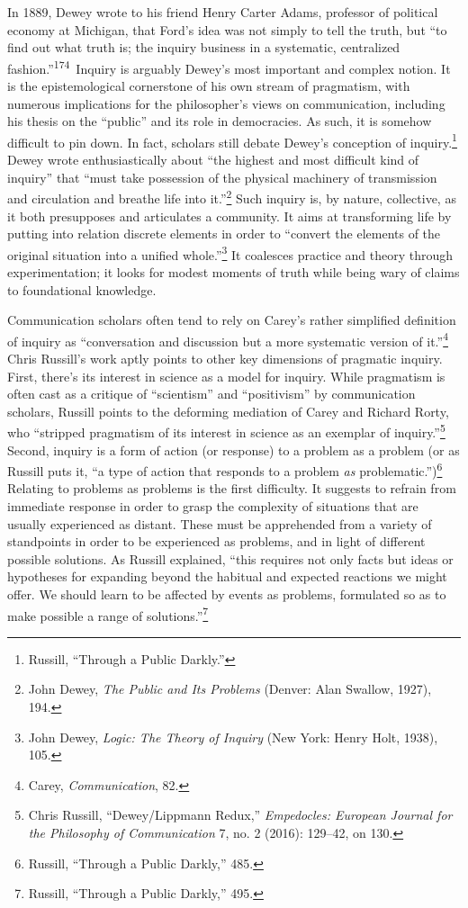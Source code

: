 \documentclass[twoside,symmetric,nobib,justified]{tufte-book}
\begin{document}
In 1889, Dewey wrote to his friend Henry Carter Adams, professor of
political economy at Michigan, that Ford's idea was not simply to tell
the truth, but ``to find out what truth is; the inquiry business in a
systematic, centralized fashion.''\textsuperscript{174}\ Inquiry is arguably Dewey's most important and
complex notion. It is the epistemological cornerstone of his own stream
of pragmatism, with numerous implications for the philosopher's views on
communication, including his thesis on the ``public'' and its role in
democracies. As such, it is somehow difficult to pin down. In fact,
scholars still debate Dewey's conception of inquiry.\footnote{Russill,
  ``Through a Public Darkly.''} Dewey wrote enthusiastically about ``the
highest and most difficult kind of inquiry'' that ``must take possession
of the physical machinery of transmission and circulation and breathe
life into it.''\footnote{John Dewey, \emph{The Public and Its Problems}
  (Denver: Alan Swallow, 1927), 194.} Such inquiry is, by nature,
collective, as it both presupposes and articulates a community. It aims
at transforming life by putting into relation discrete elements in order
to ``convert the elements of the original situation into a unified
whole.''\footnote{John Dewey, \emph{Logic: The Theory of Inquiry} (New
  York: Henry Holt, 1938), 105.} It coalesces practice and theory
through experimentation; it looks for modest moments of truth while
being wary of claims to foundational knowledge.

Communication scholars often tend to rely on Carey's rather simplified
definition of inquiry as ``conversation and discussion but a more
systematic version of it.''\footnote{Carey, \emph{Communication}, 82.}
Chris Russill's work aptly points to other key dimensions of pragmatic
inquiry. First, there's its interest in science as a model for inquiry.
While pragmatism is often cast as a critique of ``scientism'' and
``positivism'' by communication scholars, Russill points to the
deforming mediation of Carey and Richard Rorty, who ``stripped
pragmatism of its interest in science as an exemplar of
inquiry.''\footnote{Chris Russill, ``Dewey/Lippmann Redux,''
  \emph{Empedocles: European Journal for the Philosophy of
  Communication} 7, no. 2 (2016): 129--42, on 130.} Second, inquiry is a
form of action (or response) to a problem as a problem (or as Russill
puts it, ``a type of action that responds to a problem \emph{as}
problematic.'')\footnote{Russill, ``Through a Public Darkly,'' 485.}
Relating to problems as problems is the first difficulty. It suggests to
refrain from immediate response in order to grasp the complexity of
situations that are usually experienced as distant. These must be
apprehended from a variety of standpoints in order to be experienced as
problems, and in light of different possible solutions. As Russill
explained, ``this requires not only facts but ideas or hypotheses for
expanding beyond the habitual and expected reactions we might offer. We
should learn to be affected by events as problems, formulated so as to
make possible a range of solutions.''\footnote{Russill, ``Through a
  Public Darkly,'' 495.}
\end{document}
